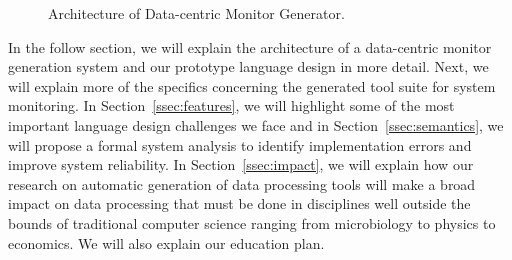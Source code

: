 \begin{figure}[t]
\begin{center}
\centerline{}
\end{center}
\caption{\label{fig:arch} Architecture of Data-centric Monitor Generator.
}
\end{figure}

In the follow section, we will explain 
the architecture of a data-centric monitor generation system
and our prototype language design in more detail.  
Next, we will explain more of the specifics concerning
the generated tool suite for system monitoring.
In Section~\ref{ssec:features}, we will highlight some of the most
important language design challenges we face and
in Section~\ref{ssec:semantics}, we will propose a
formal system analysis to identify implementation errors
and improve system reliability.
In Section~\ref{ssec:impact}, we will explain how our research
on automatic generation of data processing tools
will make a broad impact on data processing that must be done
in disciplines well outside the bounds of
traditional computer science ranging from microbiology to physics to
economics.  We will also explain our education plan.
